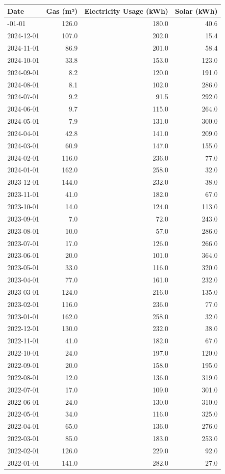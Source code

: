 \documentclass[
  letterpaper,
  DIV=11,
  numbers=noendperiod]{scrartcl}
\begin{document}
\label{tbl-utility}
\begin{longtable}[]{@{}lrrr@{}}
\toprule\noalign{}
Date & Gas (m³) & Electricity Usage (kWh) & Solar (kWh) \\
\midrule\noalign{}
\endhead
\bottomrule\noalign{}
\endlastfoot
2025-01-01 & 126.0 & 180.0 & 40.6 \\
2024-12-01 & 107.0 & 202.0 & 15.4 \\
2024-11-01 & 86.9 & 201.0 & 58.4 \\
2024-10-01 & 33.8 & 153.0 & 123.0 \\
2024-09-01 & 8.2 & 120.0 & 191.0 \\
2024-08-01 & 8.1 & 102.0 & 286.0 \\
2024-07-01 & 9.2 & 91.5 & 292.0 \\
2024-06-01 & 9.7 & 115.0 & 264.0 \\
2024-05-01 & 7.9 & 131.0 & 300.0 \\
2024-04-01 & 42.8 & 141.0 & 209.0 \\
2024-03-01 & 60.9 & 147.0 & 155.0 \\
2024-02-01 & 116.0 & 236.0 & 77.0 \\
2024-01-01 & 162.0 & 258.0 & 32.0 \\
2023-12-01 & 144.0 & 232.0 & 38.0 \\
2023-11-01 & 41.0 & 182.0 & 67.0 \\
2023-10-01 & 14.0 & 124.0 & 113.0 \\
2023-09-01 & 7.0 & 72.0 & 243.0 \\
2023-08-01 & 10.0 & 57.0 & 286.0 \\
2023-07-01 & 17.0 & 126.0 & 266.0 \\
2023-06-01 & 20.0 & 101.0 & 364.0 \\
2023-05-01 & 33.0 & 116.0 & 320.0 \\
2023-04-01 & 77.0 & 161.0 & 232.0 \\
2023-03-01 & 124.0 & 216.0 & 135.0 \\
2023-02-01 & 116.0 & 236.0 & 77.0 \\
2023-01-01 & 162.0 & 258.0 & 32.0 \\
2022-12-01 & 130.0 & 232.0 & 38.0 \\
2022-11-01 & 41.0 & 182.0 & 67.0 \\
2022-10-01 & 24.0 & 197.0 & 120.0 \\
2022-09-01 & 20.0 & 158.0 & 195.0 \\
2022-08-01 & 12.0 & 136.0 & 319.0 \\
2022-07-01 & 17.0 & 109.0 & 301.0 \\
2022-06-01 & 24.0 & 130.0 & 310.0 \\
2022-05-01 & 34.0 & 116.0 & 325.0 \\
2022-04-01 & 65.0 & 136.0 & 276.0 \\
2022-03-01 & 85.0 & 183.0 & 253.0 \\
2022-02-01 & 126.0 & 229.0 & 92.0 \\
2022-01-01 & 141.0 & 282.0 & 27.0 \\
\end{longtable}
\end{document}
